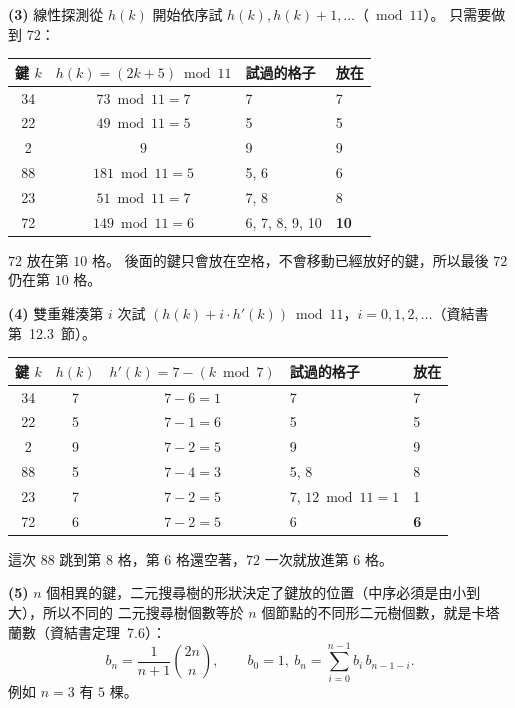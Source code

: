 \begin{pastsoln}
\textbf{(3)} 線性探測從 $h(k)$ 開始依序試 $h(k), h(k) + 1, \ldots$（$\bmod 11$）。 只需要做到 $72$：
\begin{center}
\small
\begin{tabular}{ccll}
\toprule
鍵 $k$ & $h(k) = (2k + 5) \bmod 11$ & 試過的格子 & 放在 \\
\midrule
34 & $73 \bmod 11 = 7$ & 7 & 7 \\
22 & $49 \bmod 11 = 5$ & 5 & 5 \\
2 & $9$ & 9 & 9 \\
88 & $181 \bmod 11 = 5$ & 5, 6 & 6 \\
23 & $51 \bmod 11 = 7$ & 7, 8 & 8 \\
72 & $149 \bmod 11 = 6$ & 6, 7, 8, 9, 10 & \textbf{10} \\
\bottomrule
\end{tabular}
\end{center}
$72$ 放在第 $10$ 格。 後面的鍵只會放在空格，不會移動已經放好的鍵，所以最後 $72$ 仍在第 $10$ 格。

\textbf{(4)} 雙重雜湊第 $i$ 次試 $(h(k) + i \cdot h'(k)) \bmod 11$，$i = 0, 1, 2, \ldots$（資結書
第~12.3~節）。
\begin{center}
\small
\begin{tabular}{cccll}
\toprule
鍵 $k$ & $h(k)$ & $h'(k) = 7 - (k \bmod 7)$ & 試過的格子 & 放在 \\
\midrule
34 & 7 & $7 - 6 = 1$ & 7 & 7 \\
22 & 5 & $7 - 1 = 6$ & 5 & 5 \\
2 & 9 & $7 - 2 = 5$ & 9 & 9 \\
88 & 5 & $7 - 4 = 3$ & 5, 8 & 8 \\
23 & 7 & $7 - 2 = 5$ & 7, $12 \bmod 11 = 1$ & 1 \\
72 & 6 & $7 - 2 = 5$ & 6 & \textbf{6} \\
\bottomrule
\end{tabular}
\end{center}
這次 $88$ 跳到第 $8$ 格，第 $6$ 格還空著，$72$ 一次就放進第 $6$ 格。

\textbf{(5)} $n$ 個相異的鍵，二元搜尋樹的形狀決定了鍵放的位置（中序必須是由小到大），所以不同的
二元搜尋樹個數等於 $n$ 個節點的不同形二元樹個數，就是卡塔蘭數（資結書定理~7.6）：
\[
b_n = \frac{1}{n+1}\binom{2n}{n},\qquad b_0 = 1,\ b_n = \sum_{i=0}^{n-1} b_i\, b_{n-1-i}.
\]
例如 $n = 3$ 有 $5$ 棵。
\end{pastsoln}

